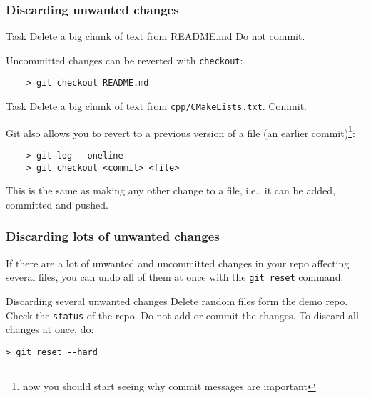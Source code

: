 \begin{frame}[fragile]
	\frametitle{Discarding unwanted changes}
	
	\begin{block}{Task}
	Delete a big chunk of text from README.md Do not commit.	
	\end{block}
	
	Uncommitted changes can be reverted with \texttt{checkout}:
	\begin{verbatim}
	> git checkout README.md
	\end{verbatim}
	
	\begin{block}{Task}
	Delete a big chunk of text from \texttt{cpp/CMakeLists.txt}. Commit.
	\end{block}
	
	Git also allows you to revert to a previous version of a file (an earlier commit)\footnote{now you should start seeing why commit messages are important}:
	\begin{verbatim}
	> git log --oneline
	> git checkout <commit> <file>
	\end{verbatim}
	This is the same as making any other change to a file, i.e., it can be added, committed and pushed.
\end{frame}


\begin{frame}[fragile]

\frametitle{Discarding lots of unwanted changes}

If there are a lot of unwanted and uncommitted changes in your repo affecting several files, you can undo all of them at once with the \texttt{git reset} command.

\begin{block}{Discarding several unwanted changes}
Delete random files form the demo repo. Check the \texttt{status} of the repo. Do not add or commit the changes. To discard all changes at once, do:
\begin{verbatim}
> git reset --hard
\end{verbatim}

\end{block}

\end{frame}



